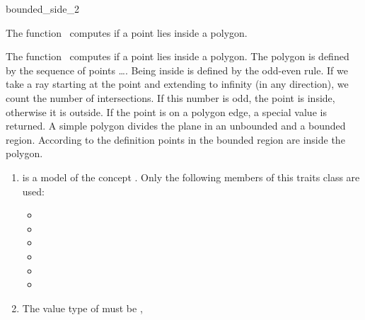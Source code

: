 

\begin{ccRefFunction}{bounded_side_2}  %


\ccDefinition

The function \ccRefName\ computes if a point lies inside a polygon.


{
The function \ccRefName\ computes if a point lies inside a polygon. 
The polygon is defined by the sequence of points \ldots {}.
Being inside is defined by the odd-even rule. If we take a ray starting at the
point and extending to infinity (in any direction), we count the number of
intersections. If this number is odd, the point is inside, otherwise it is
outside. If the point is on a polygon edge, a special value is returned.  A
simple polygon divides the plane in an unbounded and a bounded region.
According to the definition points in the bounded region are inside the polygon.
}

\begin{enumerate}
    \item {} is a model of the concept 
	  .
	  Only the following members of this traits class are used:
          \begin{itemize}
            \item {}
            \item {}
            \item {}
            \item {}
            \item {}
            \item {}
          \end{itemize}
    \item The value type of   must be ,
\end{enumerate}


\end{ccRefFunction}
